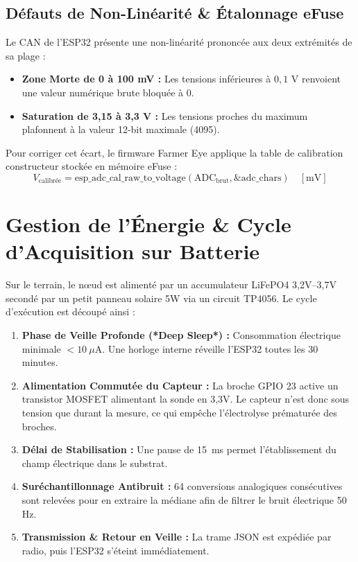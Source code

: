 \documentclass[11pt,a4paper,oneside]{report}
\begin{document}
\subsection{Défauts de Non-Linéarité & Étalonnage eFuse}
Le CAN de l'ESP32 présente une non-linéarité prononcée aux deux extrémités de sa plage :
\begin{itemize}[leftmargin=*]
    \item \textbf{Zone Morte de 0 à 100 mV :} Les tensions inférieures à $0,1\text{ V}$ renvoient une valeur numérique brute bloquée à 0.
    \item \textbf{Saturation de 3,15 à 3,3 V :} Les tensions proches du maximum plafonnent à la valeur 12-bit maximale (4095).
\end{itemize}
Pour corriger cet écart, le firmware Farmer Eye applique la table de calibration constructeur stockée en mémoire eFuse :
\begin{equation}
V_{\text{calibrée}} = \text{esp\_adc\_cal\_raw\_to\_voltage}(\text{ADC}_{\text{brut}}, \&\text{adc\_chars}) \quad [\text{mV}]
\end{equation}

\section{Gestion de l'Énergie & Cycle d'Acquisition sur Batterie}
Sur le terrain, le nœud est alimenté par un accumulateur LiFePO4 3,2V–3,7V secondé par un petit panneau solaire 5W via un circuit TP4056. Le cycle d'exécution est découpé ainsi :
\begin{enumerate}
    \item \textbf{Phase de Veille Profonde (*Deep Sleep*) :} Consommation électrique minimale $< 10\ \mu\text{A}$. Une horloge interne réveille l'ESP32 toutes les 30 minutes.
    \item \textbf{Alimentation Commutée du Capteur :} La broche GPIO 23 active un transistor MOSFET alimentant la sonde en 3,3V. Le capteur n'est donc sous tension que durant la mesure, ce qui empêche l'électrolyse prématurée des broches.
    \item \textbf{Délai de Stabilisation :} Une pause de 15~ms permet l'établissement du champ électrique dans le substrat.
    \item \textbf{Suréchantillonnage Antibruit :} 64 conversions analogiques consécutives sont relevées pour en extraire la médiane afin de filtrer le bruit électrique 50 Hz.
    \item \textbf{Transmission & Retour en Veille :} La trame JSON est expédiée par radio, puis l'ESP32 s'éteint immédiatement.
\end{enumerate}
\end{document}
